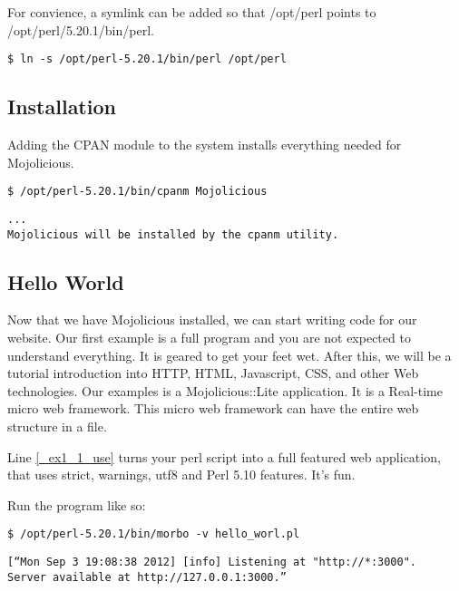 \documentclass[16pt,pdftex]{book}
\begin{document}
For convience, a symlink can be added so that /opt/perl points to
/opt/perl/5.20.1/bin/perl.

\begin{lstlisting}[style=BashInputStyle]
$ ln -s /opt/perl-5.20.1/bin/perl /opt/perl
\end{lstlisting}

\subsection{Installation}

Adding the CPAN module to the system installs everything needed for
Mojolicious. 

\begin{lstlisting}[style=BashInputStyle]
$ /opt/perl-5.20.1/bin/cpanm Mojolicious
\end{lstlisting}

\begin{lstlisting}[style=BashOutputStyle]
...
Mojolicious will be installed by the cpanm utility.
\end{lstlisting}

\subsection{Hello World}

Now that we have Mojolicious installed, we can start writing code for our
website. Our first example is a full program and you are not expected to
understand everything. It is geared to get your feet wet. After this, we will
be a tutorial introduction into HTTP, HTML, Javascript, CSS, and other Web
technologies.  Our examples is a Mojolicious::Lite application. It is a
Real-time micro web framework. This micro web framework can have the entire web
structure in a file.



Line \ref{_ex1_1_use} turns your perl script into a full featured web
application, that uses strict, warnings, utf8 and Perl 5.10 features. It's fun.

Run the program like so:

\begin{lstlisting}[style=BashInputStyle]
$ /opt/perl-5.20.1/bin/morbo -v hello_worl.pl
\end{lstlisting}

\begin{lstlisting}[style=BashOutputStyle]
[“Mon Sep 3 19:08:38 2012] [info] Listening at "http://*:3000".
Server available at http://127.0.0.1:3000.”
\end{lstlisting}
\end{document}
